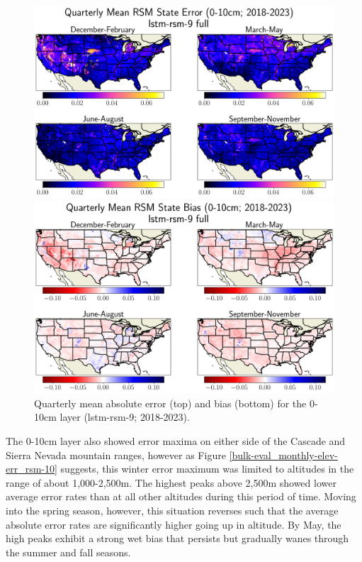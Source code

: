 \begin{figure}[hp!]
    \centering

    \includegraphics[width=.99\linewidth,draft=false]{figures/grid-eval_qtrly/eval-grid_full_lstm-rsm-9_pixelwise-time-stats_abs-err_qtrly-err-state-rsm-10.png}


    \includegraphics[width=.99\linewidth,draft=false]{figures/grid-eval_qtrly/eval-grid_full_lstm-rsm-9_pixelwise-time-stats_bias_qtrly-err-state-rsm-10.png}

    \caption{Quarterly mean absolute error (top) and bias (bottom) for the 0-10cm layer (lstm-rsm-9; 2018-2023).}
    \label{bulk-eval_qtrly_rsm-10}
\end{figure}

The 0-10cm layer also showed error maxima on either side of the Cascade and Sierra Nevada mountain ranges, however as Figure \ref{bulk-eval_monthly-elev-err_rsm-10} suggests, this winter error maximum was limited to altitudes in the range of about 1,000-2,500m. The highest peaks above 2,500m showed lower average error rates than at all other altitudes during this period of time. Moving into the spring season, however, this situation reverses such that the average absolute error rates are significantly higher going up in altitude. By May, the high peaks exhibit a strong wet bias that persists but gradually wanes through the summer and fall seasons.


